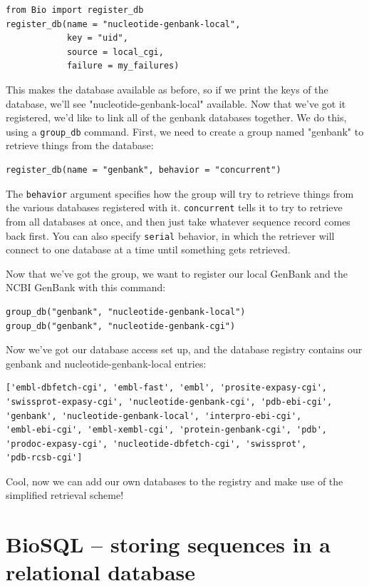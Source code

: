 \documentclass{report}
\begin{document}
\begin{verbatim}
from Bio import register_db
register_db(name = "nucleotide-genbank-local",
            key = "uid",
            source = local_cgi,
            failure = my_failures)
\end{verbatim}

This makes the database available as before, so if we print the keys of
the database, we'll see "nucleotide-genbank-local" available. Now that
we've got it registered, we'd like to link all of the genbank databases
together. We do this, using a \verb|group_db| command. First, we need to
create a group named "genbank" to retrieve things from the database:

\begin{verbatim}
register_db(name = "genbank", behavior = "concurrent")
\end{verbatim}

The \verb|behavior| argument specifies how the group will try to
retrieve things from the various databases registered with it.
\verb|concurrent| tells it to try to retrieve from all databases at
once, and then just take whatever sequence record comes back first. You
can also specify \verb|serial| behavior, in which the retriever will
connect to one database at a time until something gets retrieved.


Now that we've got the group, we want to register our local GenBank and
the NCBI GenBank with this command:

\begin{verbatim}
group_db("genbank", "nucleotide-genbank-local")
group_db("genbank", "nucleotide-genbank-cgi")
\end{verbatim}

Now we've got our database access set up, and the database registry
contains our genbank and nucleotide-genbank-local entries:

\begin{verbatim}
['embl-dbfetch-cgi', 'embl-fast', 'embl', 'prosite-expasy-cgi',
'swissprot-expasy-cgi', 'nucleotide-genbank-cgi', 'pdb-ebi-cgi',
'genbank', 'nucleotide-genbank-local', 'interpro-ebi-cgi',
'embl-ebi-cgi', 'embl-xembl-cgi', 'protein-genbank-cgi', 'pdb',
'prodoc-expasy-cgi', 'nucleotide-dbfetch-cgi', 'swissprot',
'pdb-rcsb-cgi']
\end{verbatim}


Cool, now we can add our own databases to the registry and make use of
the simplified retrieval scheme!

\section{BioSQL -- storing sequences in a relational database}
\end{document}
